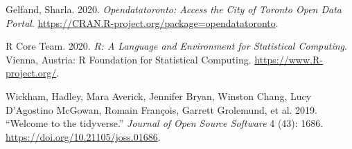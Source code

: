 \documentclass[
]{article}
\newlength{\cslhangindent}
\newlength{\cslentryspacingunit} %
\newenvironment{CSLReferences}[2] %
 {%
  \setlength{\parindent}{0pt}
  \ifodd #1
  \let\oldpar\par
  \def\par{\hangindent=\cslhangindent\oldpar}
  \fi
  \setlength{\parskip}{#2\cslentryspacingunit}
 }%
 {}
\begin{document}
\hypertarget{refs}{}
\begin{CSLReferences}{1}{0}
\leavevmode{}%
Gelfand, Sharla. 2020. \emph{Opendatatoronto: Access the City of Toronto Open Data Portal}. \url{https://CRAN.R-project.org/package=opendatatoronto}.

\leavevmode{}%
R Core Team. 2020. \emph{R: A Language and Environment for Statistical Computing}. Vienna, Austria: R Foundation for Statistical Computing. \url{https://www.R-project.org/}.

\leavevmode{}%
Wickham, Hadley, Mara Averick, Jennifer Bryan, Winston Chang, Lucy D'Agostino McGowan, Romain François, Garrett Grolemund, et al. 2019. {``Welcome to the {tidyverse}.''} \emph{Journal of Open Source Software} 4 (43): 1686. \url{https://doi.org/10.21105/joss.01686}.

\end{CSLReferences}
\end{document}
